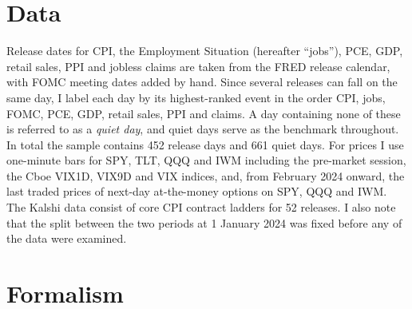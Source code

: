\documentclass[10pt]{article}
\begin{document}
\section{Data}
Release dates for CPI, the Employment Situation (hereafter ``jobs''), PCE, GDP, retail sales, PPI and jobless claims are taken from the FRED release calendar, with FOMC meeting dates added by hand. Since several releases can fall on the same day, I label each day by its highest-ranked event in the order CPI, jobs, FOMC, PCE, GDP, retail sales, PPI and claims. A day containing none of these is referred to as a \emph{quiet day}, and quiet days serve as the benchmark throughout. In total the sample contains 452 release days and 661 quiet days. For prices I use one-minute bars for SPY, TLT, QQQ and IWM including the pre-market session, the Cboe VIX1D, VIX9D and VIX indices, and, from February 2024 onward, the last traded prices of next-day at-the-money options on SPY, QQQ and IWM. The Kalshi data consist of core CPI contract ladders for 52 releases. I also note that the split between the two periods at 1 January 2024 was fixed before any of the data were examined.

\section{Formalism}
\end{document}
